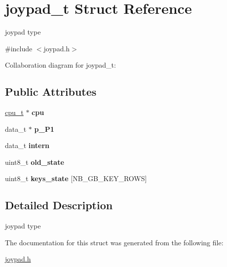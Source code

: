\hypertarget{structjoypad__t}{}\section{joypad\+\_\+t Struct Reference}
\label{structjoypad__t}


joypad type  




{\ttfamily \#include $<$joypad.\+h$>$}



Collaboration diagram for joypad\+\_\+t\+:
\subsection*{Public Attributes}
\begin{DoxyCompactItemize}
\item 
\mbox{\label{structjoypad__t_a150295f57d8c2a7438a7a888a20044fb}} 
\hyperlink{structcpu__t}{cpu\+\_\+t} $\ast$ {\bfseries cpu}
\item 
\mbox{\label{structjoypad__t_ab6a04b6a6f28b247b0adf968a7543dae}} 
data\+\_\+t $\ast$ {\bfseries p\+\_\+\+P1}
\item 
\mbox{\label{structjoypad__t_aaa1d171960b07b4fa49bffa5e52c0f89}} 
data\+\_\+t {\bfseries intern}
\item 
\mbox{\label{structjoypad__t_a62f9c5475f68b2301858391342a3703b}} 
uint8\+\_\+t {\bfseries old\+\_\+state}
\item 
\mbox{\label{structjoypad__t_a8209c754e2b513956bec6ccf6f57e947}} 
uint8\+\_\+t {\bfseries keys\+\_\+state} \mbox{[}N\+B\+\_\+\+G\+B\+\_\+\+K\+E\+Y\+\_\+\+R\+O\+WS\mbox{]}
\end{DoxyCompactItemize}


\subsection{Detailed Description}
joypad type 

The documentation for this struct was generated from the following file\+:\begin{DoxyCompactItemize}
\item 
\hyperlink{joypad_8h}{joypad.\+h}\end{DoxyCompactItemize}
